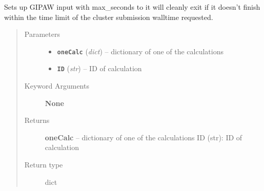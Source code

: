 \documentclass[letterpaper,10pt,english]{sphinxmanual}
\begin{document}
\begin{fulllineitems}
\label{run:run.__setupRestartGIPAW}
Sets up GIPAW input with max\_seconds to it will cleanly exit if it
doesn't finish within the time limit of the cluster submission
walltime requested.
\begin{quote}\begin{description}
\item[{Parameters}] \leavevmode\begin{itemize}
\item {} 
\textbf{\texttt{oneCalc}} (\emph{dict}) -- dictionary of one of the calculations

\item {} 
\textbf{\texttt{ID}} (\emph{str}) -- ID of calculation

\end{itemize}

\item[{Keyword Arguments}] \leavevmode
\textbf{None}

\item[{Returns}] \leavevmode
\textbf{oneCalc} --
dictionary of one of the calculations
ID (str): ID of calculation

\item[{Return type}] \leavevmode
dict

\end{description}\end{quote}

\end{fulllineitems}

\end{document}
